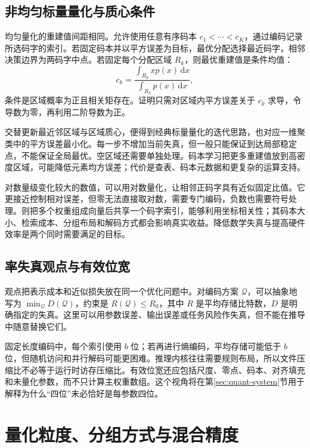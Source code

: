 \documentclass[UTF8,12pt,a4paper,fontset=fandol]{ctexart}
\begin{document}
\subsection{非均匀标量量化与质心条件}
均匀量化的重建值间距相同。允许使用任意有序码本 $c_1<\cdots<c_K$，通过编码记录所选码字的索引。若固定码本并以平方误差为目标，最优分配选择最近码字，相邻决策边界为两码字中点。若固定每个分配区域 $R_k$，则最优重建值是条件均值：
\begin{equation}
 c_k=\frac{\int_{R_k}x p(x)\,\mathrm dx}{\int_{R_k}p(x)\,\mathrm dx},
 \label{eq:quant-centroid}
\end{equation}
条件是区域概率为正且相关矩存在。证明只需对区域内平方误差关于 $c_k$ 求导，令导数为零，再利用二阶导数为正。

交替更新最近邻区域与区域质心，便得到经典标量量化的迭代思路，也对应一维聚类中的平方误差最小化。每一步不增加当前失真，但一般只能保证到达局部稳定点，不能保证全局最优。空区域还需要单独处理。码本学习把更多重建值放到高密度区域，可能降低元素均方误差；代价是查表、码本元数据和更复杂的运算支持。

对数量级变化较大的数值，可以用对数量化，让相邻正码字具有近似固定比值。它更接近控制相对误差，但零无法直接取对数，需要专门编码，负数也需要符号处理。则把多个权重组成向量后共享一个码字索引，能够利用坐标相关性；其码本大小、检索成本、分组布局和解码方式都会影响真实收益。降低数学失真与提高硬件效率是两个同时需要满足的目标。

\subsection{率失真观点与有效位宽}
观点把表示成本和近似损失放在同一个优化问题中。对编码方案 $\mathcal Q$，可以抽象地写为 $\min_{\mathcal Q}D(\mathcal Q)$，约束是 $R(\mathcal Q)\leq R_0$，其中 $R$ 是平均存储比特数，$D$ 是明确指定的失真。这里可以用参数误差、输出误差或任务风险作失真，但不能在推导中随意替换它们。

固定长度编码中，每个索引使用 $b$ 位；若再进行熵编码，平均存储可能低于 $b$ 位，但随机访问和并行解码可能更困难。推理内核往往需要规则布局，所以文件压缩比不必等于运行时访存压缩比。有效位宽还应包括尺度、零点、码本、对齐填充和未量化参数，而不只计算主权重数组。这个视角将在第\ref{sec:quant-system}节用于解释为什么“四位”未必恰好是每参数四位。

\section{量化粒度、分组方式与混合精度}
\label{sec:quant-granularity}
\end{document}

